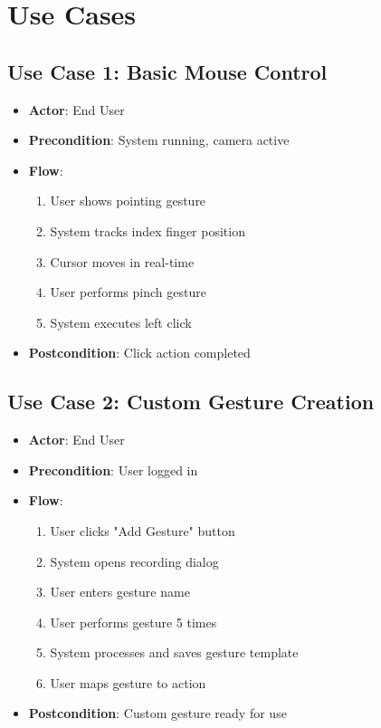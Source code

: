 \documentclass[12pt,a4paper]{report}
\begin{document}
\section{Use Cases}

\subsection{Use Case 1: Basic Mouse Control}
\begin{itemize}
    \item \textbf{Actor}: End User
    \item \textbf{Precondition}: System running, camera active
    \item \textbf{Flow}:
    \begin{enumerate}
        \item User shows pointing gesture
        \item System tracks index finger position
        \item Cursor moves in real-time
        \item User performs pinch gesture
        \item System executes left click
    \end{enumerate}
    \item \textbf{Postcondition}: Click action completed
\end{itemize}

\subsection{Use Case 2: Custom Gesture Creation}
\begin{itemize}
    \item \textbf{Actor}: End User
    \item \textbf{Precondition}: User logged in
    \item \textbf{Flow}:
    \begin{enumerate}
        \item User clicks "Add Gesture" button
        \item System opens recording dialog
        \item User enters gesture name
        \item User performs gesture 5 times
        \item System processes and saves gesture template
        \item User maps gesture to action
    \end{enumerate}
    \item \textbf{Postcondition}: Custom gesture ready for use
\end{itemize}
\end{document}
